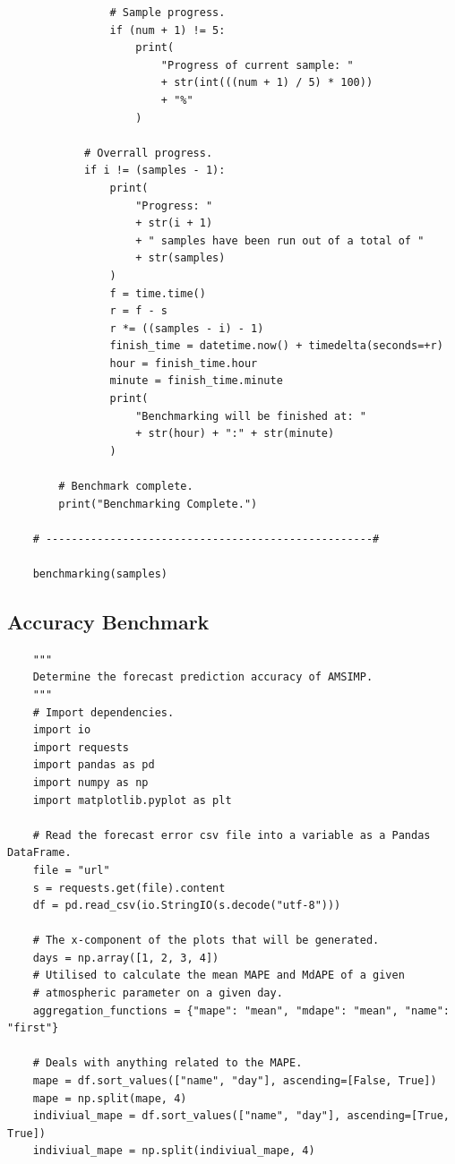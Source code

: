 \begin{appendices}
\begin{verbatim}
                # Sample progress.
                if (num + 1) != 5:
                    print(
                        "Progress of current sample: "
                        + str(int(((num + 1) / 5) * 100))
                        + "%"
                    )
    
            # Overrall progress.
            if i != (samples - 1):
                print(
                    "Progress: "
                    + str(i + 1)
                    + " samples have been run out of a total of "
                    + str(samples)
                )
                f = time.time()
                r = f - s
                r *= ((samples - i) - 1)
                finish_time = datetime.now() + timedelta(seconds=+r)
                hour = finish_time.hour
                minute = finish_time.minute
                print(
                    "Benchmarking will be finished at: "
                    + str(hour) + ":" + str(minute)
                )
    
        # Benchmark complete.
        print("Benchmarking Complete.")
    
    # ---------------------------------------------------#
    
    benchmarking(samples)
    \end{verbatim}
    
    \subsection{Accuracy Benchmark}
    \begin{verbatim}
    """
    Determine the forecast prediction accuracy of AMSIMP.
    """
    # Import dependencies.
    import io
    import requests
    import pandas as pd
    import numpy as np
    import matplotlib.pyplot as plt
    
    # Read the forecast error csv file into a variable as a Pandas DataFrame.
    file = "url"
    s = requests.get(file).content
    df = pd.read_csv(io.StringIO(s.decode("utf-8")))
    
    # The x-component of the plots that will be generated.
    days = np.array([1, 2, 3, 4])
    # Utilised to calculate the mean MAPE and MdAPE of a given 
    # atmospheric parameter on a given day.
    aggregation_functions = {"mape": "mean", "mdape": "mean", "name": "first"}
    
    # Deals with anything related to the MAPE.
    mape = df.sort_values(["name", "day"], ascending=[False, True])
    mape = np.split(mape, 4)
    indiviual_mape = df.sort_values(["name", "day"], ascending=[True, True])
    indiviual_mape = np.split(indiviual_mape, 4)
    

\end{verbatim}
\end{appendices}
